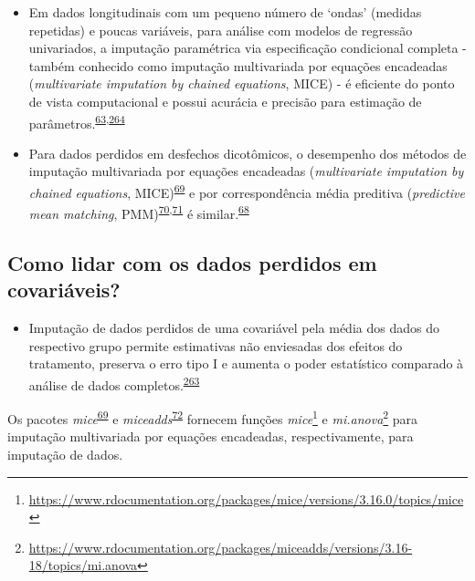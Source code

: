 \documentclass[
  a4paper,
]{book}
\providecommand{\tightlist}{%
  \setlength{\itemsep}{0pt}\setlength{\parskip}{0pt}}
\renewcommand{\href}[2]{#2\footnote{\url{#1}}}
\newenvironment{infobox}[1]
  {
  \begin{itemize}
  \renewcommand{\labelitemi}{
    \raisebox{-.7\height}[0pt][0pt]{
      {\setkeys{Gin}{width=3em,keepaspectratio}
        \texttt{[image: \#1]}}
    }
  }
  \setlength{\fboxsep}{1em}
  \begin{blackbox}
  \item
  }
  {
  \end{blackbox}
  \end{itemize}
  }
\begin{document}
\begin{itemize}
\item
  Em dados longitudinais com um pequeno número de `ondas' (medidas repetidas) e poucas variáveis, para análise com modelos de regressão univariados, a imputação paramétrica via especificação condicional completa - também conhecido como imputação multivariada por equações encadeadas (\emph{multivariate imputation by chained equations}, MICE) - é eficiente do ponto de vista computacional e possui acurácia e precisão para estimação de parâmetros.\textsuperscript{\protect\hyperlink{ref-Heymans2022}{63},\protect\hyperlink{ref-Cao2022}{264}}
\item
  Para dados perdidos em desfechos dicotômicos, o desempenho dos métodos de imputação multivariada por equações encadeadas (\emph{multivariate imputation by chained equations}, MICE)\textsuperscript{\protect\hyperlink{ref-mice}{69}} e por correspondência média preditiva (\emph{predictive mean matching}, PMM)\textsuperscript{\protect\hyperlink{ref-rubin1986}{70},\protect\hyperlink{ref-little1988a}{71}} é similar.\textsuperscript{\protect\hyperlink{ref-austin2023}{68}}
\end{itemize}

\hypertarget{como-lidar-com-os-dados-perdidos-em-covariuxe1veis}{%
\subsection{Como lidar com os dados perdidos em covariáveis?}\label{como-lidar-com-os-dados-perdidos-em-covariuxe1veis}}

\begin{itemize}
\tightlist
\item
  Imputação de dados perdidos de uma covariável pela média dos dados do respectivo grupo permite estimativas não enviesadas dos efeitos do tratamento, preserva o erro tipo I e aumenta o poder estatístico comparado à análise de dados completos.\textsuperscript{\protect\hyperlink{ref-Kahan2014}{263}}
\end{itemize}

\begin{infobox}{images/Rlogo}
Os pacotes \emph{mice}\textsuperscript{\protect\hyperlink{ref-mice}{69}} e \emph{miceadds}\textsuperscript{\protect\hyperlink{ref-miceadds}{72}} fornecem funções \href{https://www.rdocumentation.org/packages/mice/versions/3.16.0/topics/mice}{\emph{mice}} e \href{https://www.rdocumentation.org/packages/miceadds/versions/3.16-18/topics/mi.anova}{\emph{mi.anova}} para imputação multivariada por equações encadeadas, respectivamente, para imputação de dados.

\end{infobox}
\end{document}
